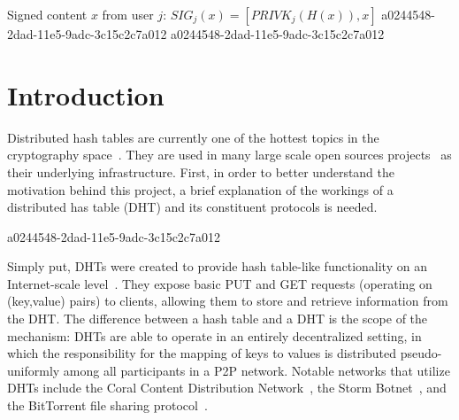 \documentclass[12pt]{article}
\begin{document}
Signed content $x$ from user $j$: $SIG_j(x) = \left[ PRIVK_j( H(x) ), x \right]$
a0244548-2dad-11e5-9adc-3c15c2c7a012
a0244548-2dad-11e5-9adc-3c15c2c7a012\section{Introduction}
\par Distributed hash tables are currently one of the hottest topics in the cryptography space~\cite{Stoica:2001dj,Rowstron:2001ea,Ratnasamy:2001wn}. They are used in many large scale open sources projects~\cite{Freitas:2013tb,Xu:2010vs,Perfitt:2010fh} as their underlying infrastructure. First, in order to better understand the motivation behind this project, a brief explanation of the workings of a distributed has table (DHT) and its constituent protocols is needed.

a0244548-2dad-11e5-9adc-3c15c2c7a012\par Simply put, DHTs were created to provide hash table-like functionality on an Internet-scale level~\cite{Ratnasamy:2001wn}. They expose basic PUT and GET requests (operating on (key,value) pairs) to clients, allowing them to store and retrieve information from the DHT. The difference between a hash table and a DHT is the scope of the mechanism: DHTs are able to operate in an entirely decentralized setting, in which the responsibility for the mapping of keys to values is distributed pseudo-uniformly among all participants in a P2P network. Notable networks that utilize DHTs include the Coral Content Distribution Network~\cite{Freedman:2004vb}, the Storm Botnet~\cite{Holz:2008uk}, and the BitTorrent file sharing protocol~\cite{Cohen:y1_8mBnw}.
\end{document}
